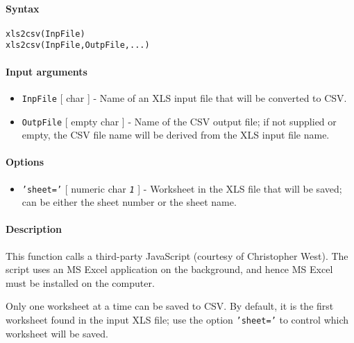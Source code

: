 


	\paragraph{Syntax}

\begin{verbatim}
xls2csv(InpFile)
xls2csv(InpFile,OutpFile,...)
\end{verbatim}

\paragraph{Input arguments}

\begin{itemize}
\item
  \texttt{InpFile} {[} char {]} - Name of an XLS input file that will be
  converted to CSV.
\item
  \texttt{OutpFile} {[} empty \textbar{} char {]} - Name of the CSV
  output file; if not supplied or empty, the CSV file name will be
  derived from the XLS input file name.
\end{itemize}

\paragraph{Options}

\begin{itemize}
\itemsep1pt\parskip0pt
\item
  \texttt{'sheet='} {[} numeric \textbar{} char \textbar{}
  \emph{\texttt{1}} {]} - Worksheet in the XLS file that will be saved;
  can be either the sheet number or the sheet name.
\end{itemize}

\paragraph{Description}

This function calls a third-party JavaScript (courtesy of Christopher
West). The script uses an MS Excel application on the background, and
hence MS Excel must be installed on the computer.

Only one worksheet at a time can be saved to CSV. By default, it is the
first worksheet found in the input XLS file; use the option
\texttt{'sheet='} to control which worksheet will be saved.

